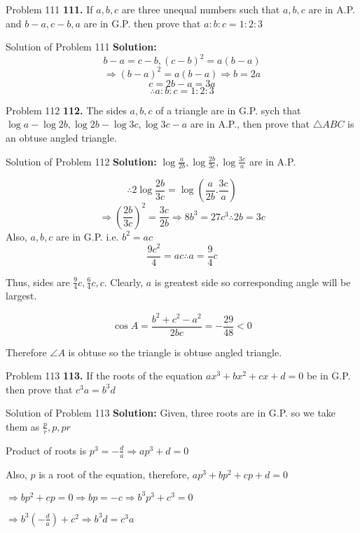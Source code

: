 \documentclass[aspectratio=1610,8pt]{beamer}
\begin{document}
\begin{frame}{Problem 111}
  \textbf{111.} If $a, b, c$ are three unequal numbers such that $a, b, c$ are in A.P. and $b - a, c - b, a$ are in G.P. then prove
  that $a:b:c = 1:2:3$
\end{frame}
\begin{frame}{Solution of Problem 111}
  \textbf{Solution:} $$b - a = c - b, (c - b)^2 = a(b - a)$$
  $$\Rightarrow (b - a)^2 = a(b - a)\Rightarrow b = 2a$$
  $$c = 2b - a = 3a$$
  $$\therefore a:b:c = 1:2:3$$
\end{frame}
\begin{frame}{Problem 112}
  \textbf{112.} The sides $a,b,c$ of a triangle are in G.P. sych that $\log a - \log 2b, \log 2b - \log 3c, \log 3c - a$ are in
  A.P., then prove that $\triangle ABC$ is an obtuse angled triangle.
\end{frame}
\begin{frame}{Solution of Problem 112}
  \textbf{Solution:} $\log \frac{a}{2b}, \log \frac{2b}{3c}, \log\frac{3c}{a}$ are in A.P.

  $$\therefore 2\log \frac{2b}{3c} = \log\left(\frac{a}{2b}.\frac{3c}{a}\right)$$
  $$\Rightarrow \left(\frac{2b}{3c}\right)^2 = \frac{3c}{2b}\Rightarrow 8b^3 = 27c^3 \therefore 2b = 3c$$
  Also, $a, b, c$ are in G.P. i.e. $b^2 = ac$
  $$\frac{9c^2}{4} = ac \therefore a = \frac{9}{4}c$$

  Thus, sides are $\frac{9}{4}c, \frac{6}{4}c, c.$ Clearly, $a$ is greatest side so corresponding angle will be largest.

  $$\cos A = \frac{b^2 + c^2 - a^2}{2bc} = -\frac{29}{48} < 0$$

  Therefore $\angle A$ is obtuse so the triangle is obtuse angled triangle.
\end{frame}
\begin{frame}{Problem 113}
  \textbf{113.} If the roots of the equation $ax^3 + bx^2 + cx + d = 0$ be in G.P. then prove that $c^3a = b^3d$
\end{frame}
\begin{frame}{Solution of Problem 113}
  \textbf{Solution:} Given, three roots are in G.P. so we take them as $\frac{p}{r}, p, pr$

  Product of roots is $p^3 = -\frac{d}{a} \Rightarrow ap^3 + d = 0$

  Also, $p$ is a root of the equation, therefore, $ap^3 + bp^2 + cp + d = 0$

  $\Rightarrow bp^2 + cp = 0 \Rightarrow bp = -c \Rightarrow b^3p^3 + c^3 = 0$

  $\Rightarrow b^3\left(-\frac{d}{a}\right) + c^2 \Rightarrow b^3d = c^3a$
\end{frame}
\end{document}

